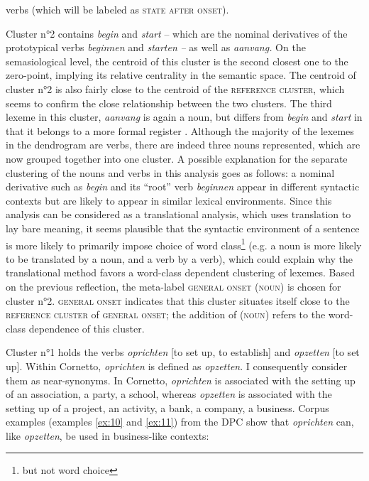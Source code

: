 verbs (which will be labeled as \textsc{state after onset}).

Cluster n°2 contains \textit{begin} and \textit{start} – which are the nominal derivatives of the prototypical verbs \textit{beginnen} and \textit{starten} \textit{–} as well as \textit{aanvang.} On the semasiological level, the centroid of this cluster is the second closest one to the zero-point, implying its relative centrality in the semantic space. The centroid of cluster n°2 is also fairly close to the centroid of the \textsc{reference cluster}, which seems to confirm the close relationship between the two clusters. The third lexeme in this cluster, \textit{aanvang} is again a noun, but differs from \textit{begin} and \textit{start} in that it belongs to a more formal register \citep{van_dale_van_2015}. Although the majority of the lexemes in the dendrogram are verbs, there are indeed three nouns represented, which are now grouped together into one cluster. A possible explanation for the separate clustering of the nouns and verbs in this analysis goes as follows: a nominal derivative such as \textit{begin} and its ``root'' verb \textit{beginnen} appear in different syntactic contexts but are likely to appear in similar lexical environments. Since this analysis can be considered as a translational analysis, which uses translation to lay bare meaning, it seems plausible that the syntactic environment of a sentence is more likely to primarily impose choice of word class\footnote{but not word choice} (e.g. a noun is more likely to be translated by a noun, and a verb by a verb), which could explain why the translational method favors a word-class dependent clustering of lexemes. Based on the previous reflection, the meta-label \textsc{general onset} (\textsc{noun}) is chosen for cluster n°2. \textsc{general onset} indicates that this cluster situates itself close to the \textsc{reference cluster} of \textsc{general onset}; the addition of (\textsc{noun}) refers to the word-class dependence of this cluster.

Cluster n°1 holds the verbs \textit{oprichten} [to set up, to establish] and \textit{opzetten} [to set up]. Within Cornetto, \textit{oprichten} is defined as \textit{opzetten}. I consequently consider them as near-synonyms. In Cornetto, \textit{oprichten} is associated with the setting up of an association, a party, a school, whereas \textit{opzetten} is associated with the setting up of a project, an activity, a bank, a company, a business. Corpus examples (examples \ref{ex:10} and \ref{ex:11}) from the DPC show that \textit{oprichten} can, like \textit{opzetten}, be used in business-like contexts:


